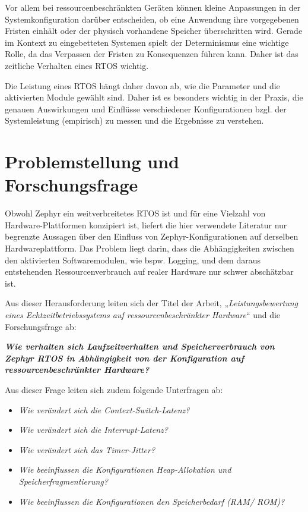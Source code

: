 Vor allem bei ressourcenbeschränkten Geräten können kleine Anpassungen in der Systemkonfiguration darüber entscheiden, ob eine Anwendung ihre vorgegebenen Fristen einhält oder der physisch vorhandene Speicher überschritten wird. Gerade im Kontext zu eingebetteten Systemen spielt der Determinismus eine wichtige Rolle, da das Verpassen der Fristen zu Konsequenzen führen kann. Daher ist das zeitliche Verhalten eines RTOS wichtig.

Die Leistung eines RTOS hängt daher davon ab, wie die Parameter und die aktivierten Module gewählt sind. Daher ist es besonders wichtig in der Praxis, die genauen Auswirkungen und Einflüsse verschiedener Konfigurationen bzgl. der Systemleistung (empirisch) zu messen und die Ergebnisse zu verstehen.


\section{Problemstellung und Forschungsfrage}
Obwohl Zephyr ein weitverbreitetes RTOS ist und für eine Vielzahl von Hardware-Plattformen konzipiert ist, liefert die hier verwendete Literatur nur begrenzte Aussagen über den Einfluss von Zephyr-Konfigurationen auf derselben Hardwareplattform. Das Problem liegt darin, dass die Abhängigkeiten zwischen den aktivierten Softwaremodulen, wie bspw. Logging, und dem daraus entstehenden Ressourcenverbrauch auf realer Hardware nur schwer abschätzbar ist.

Aus dieser Herausforderung leiten sich der Titel der Arbeit, „\emph{Leistungsbewertung eines Echtzeitbetriebssystems auf ressourcenbeschränkter Hardware}“ und die Forschungsfrage ab:

\textbf{\emph{Wie verhalten sich Laufzeitverhalten und Speicherverbrauch von Zephyr RTOS in Abhängigkeit von der Konfiguration auf ressourcenbeschränkter Hardware?}}

Aus dieser Frage leiten sich zudem folgende Unterfragen ab:

\begin{itemize}
\item \emph{Wie verändert sich die Context-Switch-Latenz?}
\item \emph{Wie verändert sich die Interrupt-Latenz?}
\item \emph{Wie verändert sich das Timer-Jitter?}
\item \emph{Wie beeinflussen die Konfigurationen Heap-Allokation und Speicherfragmentierung?}
\item \emph{Wie beeinflussen die Konfigurationen den Speicherbedarf (RAM/ ROM)?}
\end{itemize}

